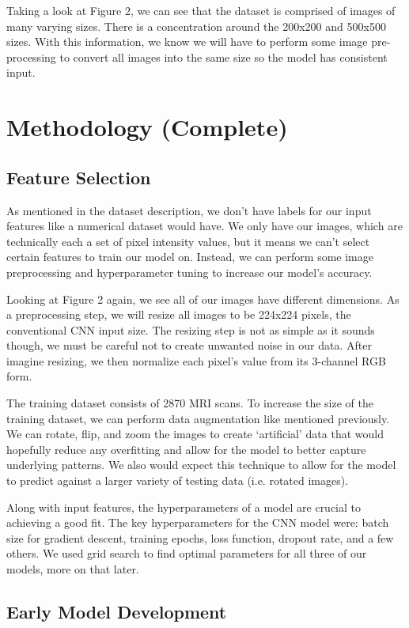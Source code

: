 \documentclass[conference]{IEEEtran}
\begin{document}
Taking a look at Figure 2, we can see that the dataset is comprised of images of many varying sizes. There is a concentration around the 200x200 and 500x500 sizes. With this information, we know we will have to perform some image pre-processing to convert all images into the same size so the model has consistent input. 

\section{\large Methodology (Complete)}

\subsection{\large Feature Selection}

As mentioned in the dataset description, we don't have labels for our input features like a numerical dataset would have. We only have our images, which are technically each a set of pixel intensity values, but it means we can't select certain features to train our model on. Instead, we can perform some image preprocessing and hyperparameter tuning to increase our model's accuracy.

Looking at Figure 2 again, we see all of our images have different dimensions. As a preprocessing step, we will resize all images to be 224x224 pixels, the conventional CNN input size. The resizing step is not as simple as it sounds though, we must be careful not to create unwanted noise in our data. After imagine resizing, we then normalize each pixel's value from its 3-channel RGB form.

The training dataset consists of 2870 MRI scans. To increase the size of the training dataset, we can perform data augmentation like mentioned previously. We can rotate, flip, and zoom the images to create `artificial' data that would hopefully reduce any overfitting and allow for the model to better capture underlying patterns. We also would expect this technique to allow for the model to predict against a larger variety of testing data (i.e. rotated images). 

Along with input features, the hyperparameters of a model are crucial to achieving a good fit. The key hyperparameters for the CNN model were: batch size for gradient descent, training epochs, loss function, dropout rate, and a few others. We used grid search to find optimal parameters for all three of our models, more on that later. 

\subsection{\large Early Model Development}
\end{document}
